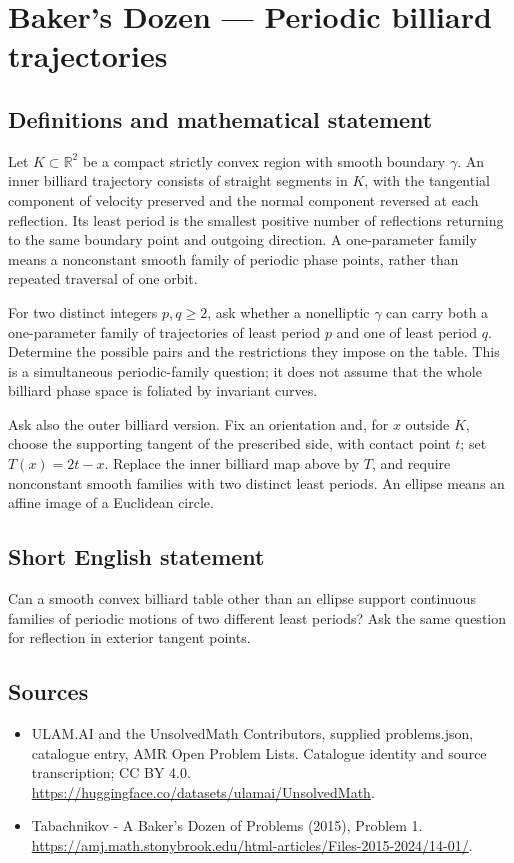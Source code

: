 \documentclass[11pt,a4paper]{article}
\begin{document}
\section*{Baker's Dozen — Periodic billiard trajectories}\label{statement}

\subsection{Definitions and mathematical statement}
Let $K\subset\mathbb R^2$ be a compact strictly convex region with smooth boundary
$\gamma$. An inner billiard trajectory consists of straight segments in $K$,
with the tangential component of velocity preserved and the normal component
reversed at each reflection. Its least period is the smallest positive number
of reflections returning to the same boundary point and outgoing direction.
A one-parameter family means a nonconstant smooth family of periodic phase
points, rather than repeated traversal of one orbit.

For two distinct integers $p,q\ge2$, ask whether a nonelliptic $\gamma$ can carry
both a one-parameter family of trajectories of least period $p$ and one of
least period $q$. Determine the possible pairs and the restrictions they impose
on the table. This is a simultaneous periodic-family question; it does not
assume that the whole billiard phase space is foliated by invariant curves.

Ask also the outer billiard version. Fix an orientation and, for $x$ outside
$K$, choose the supporting tangent of the prescribed side, with contact point
$t$; set $T(x)=2t-x$. Replace the inner billiard map above by $T$, and require
nonconstant smooth families with two distinct least periods. An ellipse means
an affine image of a Euclidean circle.
\subsection{Short English statement}
Can a smooth convex billiard table other than an ellipse support continuous
families of periodic motions of two different least periods? Ask the same
question for reflection in exterior tangent points.
\subsection{Sources}
\begin{itemize}
\item[S1] ULAM.AI and the UnsolvedMath Contributors, supplied problems.json, catalogue entry, AMR Open Problem Lists. Catalogue identity and source transcription; CC BY 4.0.
\url{https://huggingface.co/datasets/ulamai/UnsolvedMath}.
\item[S2] Tabachnikov - A Baker's Dozen of Problems (2015), Problem 1. 
\url{https://amj.math.stonybrook.edu/html-articles/Files-2015-2024/14-01/}.
\end{itemize}
\end{document}
